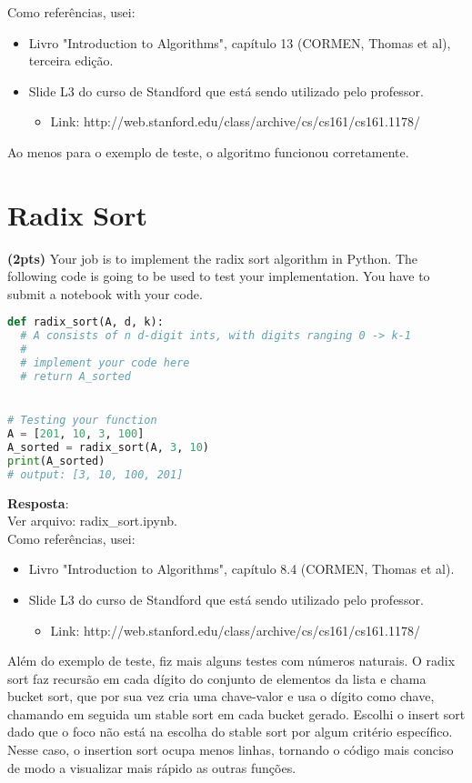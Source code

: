 \documentclass{article}
\begin{document}
Como referências, usei:
\begin{itemize}
	\item Livro "Introduction to Algorithms", capítulo 13 (CORMEN, Thomas et al), terceira edição.
	\item Slide L3 do curso de Standford que está sendo utilizado pelo professor. 
	\begin{itemize}
		\item Link: http://web.stanford.edu/class/archive/cs/cs161/cs161.1178/
	\end{itemize}
\end{itemize}

Ao menos para o exemplo de teste, o algoritmo funcionou corretamente.

\section{Radix Sort}

\textbf{(2pts) }Your job is to implement the radix sort algorithm in Python. The following code is going to be used to test your implementation. You have to submit a notebook with your code. 
  
\begin{lstlisting}[language=Python]
def radix_sort(A, d, k):
  # A consists of n d-digit ints, with digits ranging 0 -> k-1
  #
  # implement your code here
  # return A_sorted


# Testing your function
A = [201, 10, 3, 100]
A_sorted = radix_sort(A, 3, 10)
print(A_sorted)
# output: [3, 10, 100, 201]
\end{lstlisting}

\textbf{Resposta}:\\

Ver arquivo: radix\_sort.ipynb.\\

Como referências, usei:
\begin{itemize}
	\item Livro "Introduction to Algorithms", capítulo 8.4 (CORMEN, Thomas et al).
	\item Slide L3 do curso de Standford que está sendo utilizado pelo professor. 
	\begin{itemize}
		\item Link: http://web.stanford.edu/class/archive/cs/cs161/cs161.1178/
	\end{itemize}
\end{itemize}
  
 
Além do exemplo de teste, fiz mais alguns testes com números naturais. O radix sort faz  recursão em cada dígito do conjunto de elementos da lista e chama bucket sort, que por sua vez cria uma chave-valor e usa o dígito como chave, chamando em seguida um stable sort em cada bucket gerado. Escolhi o insert sort dado que o foco não está na escolha do stable sort por algum critério específico. Nesse caso, o insertion sort ocupa menos linhas, tornando o código mais conciso de modo a visualizar mais rápido as outras funções.
\end{document}
